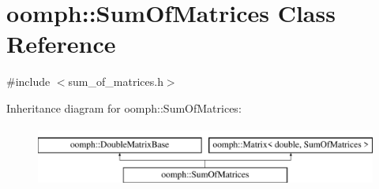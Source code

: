 \hypertarget{classoomph_1_1SumOfMatrices}{}\section{oomph\+:\+:Sum\+Of\+Matrices Class Reference}
\label{classoomph_1_1SumOfMatrices}


{\ttfamily \#include $<$sum\+\_\+of\+\_\+matrices.\+h$>$}

Inheritance diagram for oomph\+:\+:Sum\+Of\+Matrices\+:\begin{figure}[H]
\begin{center}
\leavevmode
\includegraphics[height=2.000000cm]{classoomph_1_1SumOfMatrices}
\end{center}
\end{figure}
